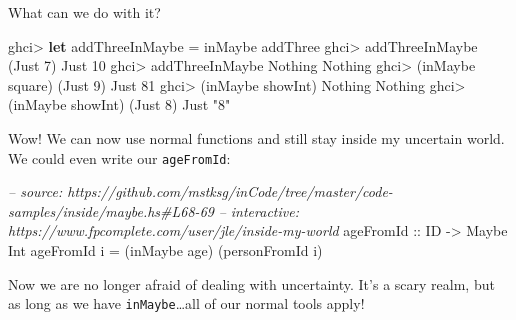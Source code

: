 \documentclass[]{article}
\newenvironment{Shaded}{}{}
\newcommand{\KeywordTok}[1]{\textcolor[rgb]{0.00,0.44,0.13}{\textbf{{#1}}}}
\newcommand{\DataTypeTok}[1]{\textcolor[rgb]{0.56,0.13,0.00}{{#1}}}
\newcommand{\DecValTok}[1]{\textcolor[rgb]{0.25,0.63,0.44}{{#1}}}
\newcommand{\StringTok}[1]{\textcolor[rgb]{0.25,0.44,0.63}{{#1}}}
\newcommand{\CommentTok}[1]{\textcolor[rgb]{0.38,0.63,0.69}{\textit{{#1}}}}
\newcommand{\OtherTok}[1]{\textcolor[rgb]{0.00,0.44,0.13}{{#1}}}
\newcommand{\FunctionTok}[1]{\textcolor[rgb]{0.02,0.16,0.49}{{#1}}}
\newcommand{\NormalTok}[1]{{#1}}
\begin{document}
What can we do with it?

\begin{Shaded}
\begin{Highlighting}[]
\NormalTok{ghci}\FunctionTok{>} \KeywordTok{let} \NormalTok{addThreeInMaybe }\FunctionTok{=} \NormalTok{inMaybe addThree}
\NormalTok{ghci}\FunctionTok{>} \NormalTok{addThreeInMaybe (}\DataTypeTok{Just} \DecValTok{7}\NormalTok{)}
\DataTypeTok{Just} \DecValTok{10}
\NormalTok{ghci}\FunctionTok{>} \NormalTok{addThreeInMaybe }\DataTypeTok{Nothing}
\DataTypeTok{Nothing}
\NormalTok{ghci}\FunctionTok{>} \NormalTok{(inMaybe square) (}\DataTypeTok{Just} \DecValTok{9}\NormalTok{)}
\DataTypeTok{Just} \DecValTok{81}
\NormalTok{ghci}\FunctionTok{>} \NormalTok{(inMaybe showInt) }\DataTypeTok{Nothing}
\DataTypeTok{Nothing}
\NormalTok{ghci}\FunctionTok{>} \NormalTok{(inMaybe showInt) (}\DataTypeTok{Just} \DecValTok{8}\NormalTok{)}
\DataTypeTok{Just} \StringTok{"8"}
\end{Highlighting}
\end{Shaded}

Wow! We can now use normal functions and still stay inside my uncertain
world. We could even write our \texttt{ageFromId}:

\begin{Shaded}
\begin{Highlighting}[]
\CommentTok{-- source: https://github.com/mstksg/inCode/tree/master/code-samples/inside/maybe.hs#L68-69}
\CommentTok{-- interactive: https://www.fpcomplete.com/user/jle/inside-my-world}
\OtherTok{ageFromId ::} \DataTypeTok{ID} \OtherTok{->} \DataTypeTok{Maybe} \DataTypeTok{Int}
\NormalTok{ageFromId i }\FunctionTok{=} \NormalTok{(inMaybe age) (personFromId i)}
\end{Highlighting}
\end{Shaded}

Now we are no longer afraid of dealing with uncertainty. It's a scary
realm, but as long as we have \texttt{inMaybe}\ldots{}all of our normal
tools apply!
\end{document}
